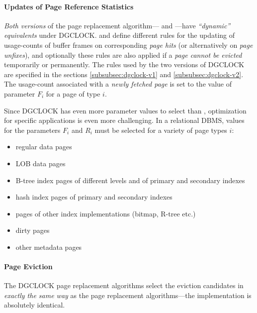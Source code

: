 \paragraph{Updates of Page Reference Statistics}

    \emph{Both versions} of the  page replacement algorithm--- and ---have \emph{``dynamic'' equivalents} under DGCLOCK.  and  define different rules for the updating of usage-counts of buffer frames on corresponding \emph{page hits} (or alternatively on \emph{page unfixes}), and optionally these rules are also applied if a \emph{page cannot be evicted} temporarily or permanently. The rules used by the two versions of DGCLOCK are specified in the sections \ref{subsubsec:dgclock-v1} and \ref{subsubsec:dgclock-v2}. The usage-count associated with a \emph{newly fetched page} is set to the value of parameter $F_i$ for a page of type $i$.

    Since DGCLOCK has even more parameter values to select than , optimization for specific applications is even more challenging. In a relational DBMS, values for the parameters $F_i$ and $R_i$ must be selected for a variety of page types $i$:

\begin{itemize}
    \item regular data pages
    \item LOB data pages
    \item B-tree index pages of different levels and of primary and secondary indexes
    \item hash index pages of primary and secondary indexes
    \item pages of other index implementations (bitmap, R-tree etc.)
    \item dirty pages
    \item other metadata pages
\end{itemize}

\paragraph{Page Eviction}

    The DGCLOCK page replacement algorithms select the eviction candidates in \emph{exactly the same way} as the  page replacement algorithms---the implementation is absolutely identical.

